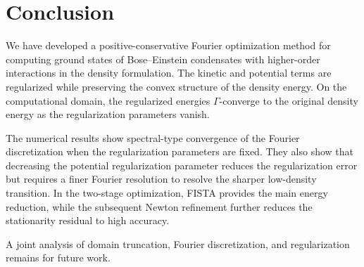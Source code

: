 \documentclass[11pt]{article}
\theoremstyle{plain}
\theoremstyle{definition}
\numberwithin{equation}{section}
\begin{document}
\section{Conclusion}
\label{sec:summary}

%


We have developed a positive-conservative Fourier optimization method
for computing ground states of Bose--Einstein condensates with
higher-order interactions in the density formulation. The kinetic and
potential terms are regularized while preserving the convex structure
of the density energy. On the computational domain, the regularized
energies $\Gamma$-converge to the original density energy as the
regularization parameters vanish.

The numerical results show spectral-type convergence of the Fourier
discretization when the regularization parameters are fixed. 
They also show
that decreasing the potential regularization parameter reduces the
regularization error but requires a finer Fourier resolution to resolve
the sharper low-density transition. In the two-stage optimization,
FISTA provides the main energy reduction, while the subsequent Newton
refinement further reduces the stationarity residual to high accuracy.

A joint analysis of domain truncation, Fourier discretization, and
regularization remains for future work.


\end{document}
